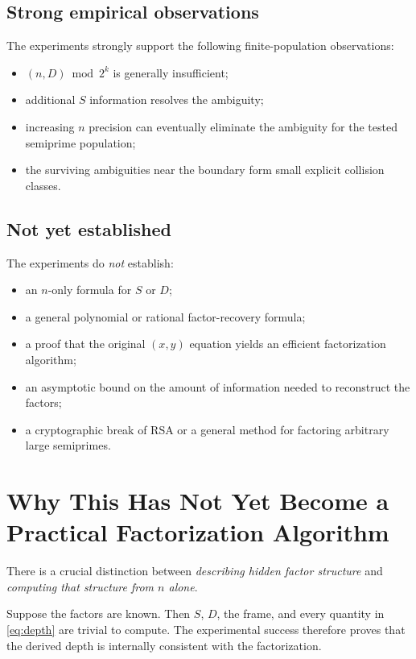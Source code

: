 \documentclass[11pt,a4paper]{article}
\begin{document}
\subsection{Strong empirical observations}
The experiments strongly support the following finite-population observations:
\begin{itemize}[leftmargin=1.7em]
    \item $(n,D)\bmod2^k$ is generally insufficient;
    \item additional $S$ information resolves the ambiguity;
    \item increasing $n$ precision can eventually eliminate the ambiguity for the tested semiprime population;
    \item the surviving ambiguities near the boundary form small explicit collision classes.
\end{itemize}

\subsection{Not yet established}
The experiments do \emph{not} establish:
\begin{itemize}[leftmargin=1.7em]
    \item an $n$-only formula for $S$ or $D$;
    \item a general polynomial or rational factor-recovery formula;
    \item a proof that the original $(x,y)$ equation yields an efficient factorization algorithm;
    \item an asymptotic bound on the amount of information needed to reconstruct the factors;
    \item a cryptographic break of RSA or a general method for factoring arbitrary large semiprimes.
\end{itemize}

\section{Why This Has Not Yet Become a Practical Factorization Algorithm}

There is a crucial distinction between \emph{describing hidden factor structure} and \emph{computing that structure from $n$ alone}.

Suppose the factors are known.  Then $S$, $D$, the frame, and every quantity in \eqref{eq:depth} are trivial to compute.  The experimental success therefore proves that the derived depth is internally consistent with the factorization.
\end{document}
